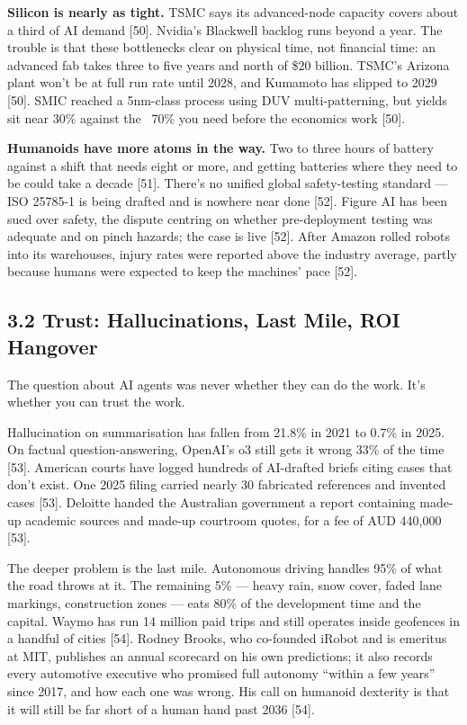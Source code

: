 \documentclass[11pt,a4paper]{article}
\begin{document}
\textbf{Silicon is nearly as tight.} TSMC says its advanced-node capacity covers about a third of AI demand [50]. Nvidia's Blackwell backlog runs beyond a year. The trouble is that these bottlenecks clear on physical time, not financial time: an advanced fab takes three to five years and north of \$20 billion. TSMC's Arizona plant won't be at full run rate until 2028, and Kumamoto has slipped to 2029 [50]. SMIC reached a 5nm-class process using DUV multi-patterning, but yields sit near 30\% against the ~70\% you need before the economics work [50].

\textbf{Humanoids have more atoms in the way.} Two to three hours of battery against a shift that needs eight or more, and getting batteries where they need to be could take a decade [51]. There's no unified global safety-testing standard --- ISO 25785-1 is being drafted and is nowhere near done [52]. Figure AI has been sued over safety, the dispute centring on whether pre-deployment testing was adequate and on pinch hazards; the case is live [52]. After Amazon rolled robots into its warehouses, injury rates were reported above the industry average, partly because humans were expected to keep the machines' pace [52].

\subsection{3.2 Trust: Hallucinations, Last Mile, ROI Hangover}

The question about AI agents was never whether they can do the work. It's whether you can trust the work.

Hallucination on summarisation has fallen from 21.8\% in 2021 to 0.7\% in 2025. On factual question-answering, OpenAI's o3 still gets it wrong 33\% of the time [53]. American courts have logged hundreds of AI-drafted briefs citing cases that don't exist. One 2025 filing carried nearly 30 fabricated references and invented cases [53]. Deloitte handed the Australian government a report containing made-up academic sources and made-up courtroom quotes, for a fee of AUD 440,000 [53].

The deeper problem is the last mile. Autonomous driving handles 95\% of what the road throws at it. The remaining 5\% --- heavy rain, snow cover, faded lane markings, construction zones --- eats 80\% of the development time and the capital. Waymo has run 14 million paid trips and still operates inside geofences in a handful of cities [54]. Rodney Brooks, who co-founded iRobot and is emeritus at MIT, publishes an annual scorecard on his own predictions; it also records every automotive executive who promised full autonomy ``within a few years'' since 2017, and how each one was wrong. His call on humanoid dexterity is that it will still be far short of a human hand past 2036 [54].
\end{document}
